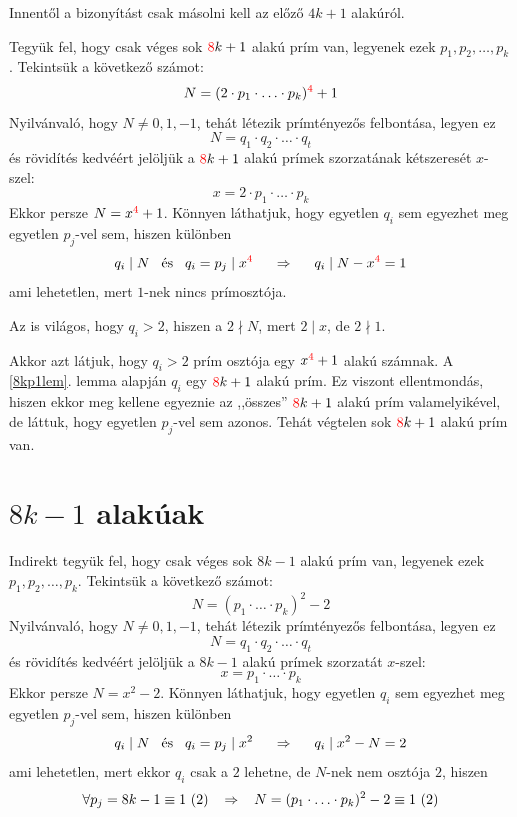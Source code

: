 \documentclass[12pt]{book}
\theoremstyle{plain} %
\theoremstyle{definition} %
\theoremstyle{remark}
\numberwithin{equation}{section}  %
\begin{document}
	Innentől a bizonyítást csak másolni kell az előző $4k+1$ alakúról.
	
	Tegyük fel, hogy csak véges sok $\color{red}8\color{black}k+1$ alakú prím van, legyenek ezek $p_1,p_2,\ldots,p_k$. Tekintsük a következő számot:
	\[ N = (2\cdot p_1\cdot \ldots \cdot p_k)^{\color{red}4} + 1  \]
	Nyilvánvaló, hogy $N\neq 0,1,-1$, tehát létezik prímtényezős felbontása, legyen ez
	\[ N = q_1\cdot q_2\cdot \ldots \cdot q_t  \]
	és rövidítés kedvéért jelöljük a $\color{red}8\color{black}k+1$ alakú prímek szorzatának kétszeresét $x$-szel:
	\[ x = 2\cdot p_1\cdot \ldots \cdot p_k   \]
	Ekkor persze $N=x^{\color{red} 4}+1$. Könnyen láthatjuk, hogy egyetlen $q_i$ sem egyezhet meg egyetlen $p_j$-vel sem, hiszen különben
	\[ q_i \mid N \hspace{3mm} \text{és} \hspace{3mm} q_i=p_j\mid x^{\color{red}4} \hspace{5mm} \Rightarrow \hspace{5mm} q_i\mid N-x^{\color{red}4}=1  \]
	ami lehetetlen, mert $1$-nek nincs prímosztója.
	
	Az is világos, hogy $q_i>2$, hiszen a $2\nmid N$, mert $2\mid x$, de $2\nmid 1$.
	
	Akkor azt látjuk, hogy $q_i>2$ prím osztója egy $x^{\color{red}4}+1$ alakú számnak. A \ref{8kp1lem}. lemma alapján $q_i$ egy $\color{red}8\color{black}k+1$ alakú prím. Ez viszont ellentmondás, hiszen ekkor meg kellene egyeznie az ,,összes'' $\color{red}8\color{black}k+1$  alakú prím valamelyikével, de láttuk, hogy egyetlen $p_j$-vel sem azonos. Tehát végtelen sok $\color{red}8\color{black}k+1$ alakú prím van.
	
	\section{$8k-1$ alakúak}
	
	Indirekt tegyük fel, hogy csak véges sok $8k-1$ alakú prím van, legyenek ezek $p_1,p_2,\ldots,p_k$. Tekintsük a következő számot:
	\[ N = (p_1\cdot \ldots \cdot p_k)^{2} - 2  \]
	Nyilvánvaló, hogy $N\neq 0,1,-1$, tehát létezik prímtényezős felbontása, legyen ez
	\[ N = q_1\cdot q_2\cdot \ldots \cdot q_t  \]
	és rövidítés kedvéért jelöljük a $8k-1$ alakú prímek szorzatát $x$-szel:
	\[ x = p_1\cdot \ldots \cdot p_k   \]
	Ekkor persze $N=x^{2}-2$. Könnyen láthatjuk, hogy egyetlen $q_i$ sem egyezhet meg egyetlen $p_j$-vel sem, hiszen különben
	\[ q_i \mid N \hspace{3mm} \text{és} \hspace{3mm} q_i=p_j\mid x^{2} \hspace{5mm} \Rightarrow \hspace{5mm} q_i\mid x^{2}-N=2  \]
	ami lehetetlen, mert ekkor $q_i$ csak a $2$ lehetne, de $N$-nek nem osztója $2$, hiszen
	\[ \forall p_j = 8k-1 \equiv 1\ (2) \hspace{3mm} \Rightarrow \hspace{3mm} N = (p_1\cdot \ldots \cdot p_k)^2 - 2 \equiv 1\ (2)  \]
	
\end{document}

